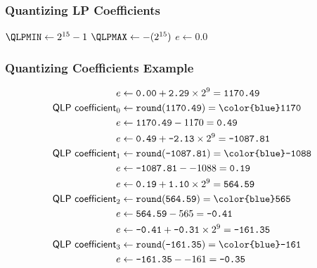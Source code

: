 \subsubsection{Quantizing LP Coefficients}
\label{alac:quantize_lp_coeffs}
$\QLPMIN \leftarrow 2 ^ \text{15} - 1$\;
$\QLPMAX \leftarrow -(2 ^ \text{15})$\;
$e \leftarrow 0.0$\;
\Return \QLPCOEFF\;
\EALGORITHM

\clearpage

\subsubsection{Quantizing Coefficients Example}
\begin{align*}
e &\leftarrow \texttt{0.00} + \texttt{2.29} \times 2 ^ 9 = \texttt{1170.49} \\
\textsf{QLP coefficient}_0 &\leftarrow \texttt{round}(\texttt{1170.49}) = \texttt{\color{blue}1170} \\
e &\leftarrow \texttt{1170.49} - 1170 = \texttt{0.49} \\
e &\leftarrow \texttt{0.49} + \texttt{-2.13} \times 2 ^ 9 = \texttt{-1087.81} \\
\textsf{QLP coefficient}_1 &\leftarrow \texttt{round}(\texttt{-1087.81}) = \texttt{\color{blue}-1088} \\
e &\leftarrow \texttt{-1087.81} - -1088 = \texttt{0.19} \\
e &\leftarrow \texttt{0.19} + \texttt{1.10} \times 2 ^ 9 = \texttt{564.59} \\
\textsf{QLP coefficient}_2 &\leftarrow\texttt{round}(\texttt{564.59}) = \texttt{\color{blue}565} \\
e &\leftarrow \texttt{564.59} - 565 = \texttt{-0.41} \\
e &\leftarrow \texttt{-0.41} + \texttt{-0.31} \times 2 ^ 9 = \texttt{-161.35} \\
\textsf{QLP coefficient}_3 &\leftarrow \texttt{round}(\texttt{-161.35}) = \texttt{\color{blue}-161} \\
e &\leftarrow \texttt{-161.35} - -161 = \texttt{-0.35} \\
\end{align*}
